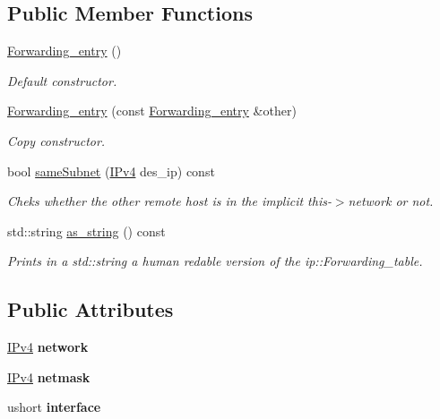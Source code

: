 \subsection*{Public Member Functions}
\begin{DoxyCompactItemize}
\item 
\hyperlink{structip_1_1Forwarding__entry_af4c7f746d7de8206146adf933ad3dbe8}{Forwarding\+\_\+entry} ()
\begin{DoxyCompactList}\small\item\em Default constructor. \end{DoxyCompactList}\item 
\hyperlink{structip_1_1Forwarding__entry_a9cdd6c01091d718a32a11342c3998f9f}{Forwarding\+\_\+entry} (const \hyperlink{structip_1_1Forwarding__entry}{Forwarding\+\_\+entry} \&other)
\begin{DoxyCompactList}\small\item\em Copy constructor. \end{DoxyCompactList}\item 
bool \hyperlink{structip_1_1Forwarding__entry_a15177e8af63ffd9d41a72a55abfcbb58}{same\+Subnet} (\hyperlink{structIPv4}{I\+Pv4} des\+\_\+ip) const 
\begin{DoxyCompactList}\small\item\em Cheks whether the other remote host is in the implicit this-\/$>$network or not. \end{DoxyCompactList}\item 
std\+::string \hyperlink{structip_1_1Forwarding__entry_a7b005eaf733338c728b9e63c00a84668}{as\+\_\+string} () const 
\begin{DoxyCompactList}\small\item\em Prints in a std\+::string a human redable version of the ip\+::\+Forwarding\+\_\+table. \end{DoxyCompactList}\end{DoxyCompactItemize}
\subsection*{Public Attributes}
\begin{DoxyCompactItemize}
\item 
\hyperlink{structIPv4}{I\+Pv4} {\bfseries network}\hypertarget{structip_1_1Forwarding__entry_aec0c736499656bd68f001cc50b6b4017}{}\label{structip_1_1Forwarding__entry_aec0c736499656bd68f001cc50b6b4017}

\item 
\hyperlink{structIPv4}{I\+Pv4} {\bfseries netmask}\hypertarget{structip_1_1Forwarding__entry_a51b8230ced4d6e7ea1e17f357bea242a}{}\label{structip_1_1Forwarding__entry_a51b8230ced4d6e7ea1e17f357bea242a}

\item 
ushort {\bfseries interface}\hypertarget{structip_1_1Forwarding__entry_aa84edda440aa39d70142b02320be2e07}{}\label{structip_1_1Forwarding__entry_aa84edda440aa39d70142b02320be2e07}

\end{DoxyCompactItemize}


